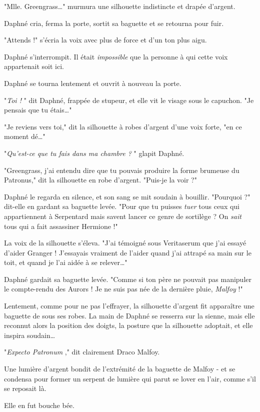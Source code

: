 "Mlle. Greengrass…" murmura une silhouette indistincte et drapée d'argent.

Daphné cria, ferma la porte, sortit sa baguette et se retourna pour fuir.

"Attends !" s'écria la voix avec plus de force et d'un ton plus aigu.

Daphné s'interrompit. Il était \emph{impossible}  que la personne à qui cette voix appartenait soit ici.

Daphné se tourna lentement et ouvrit à nouveau la porte.

"\emph{Toi !} " dit Daphné, frappée de stupeur, et elle vit le visage sous le capuchon. "Je pensais que tu étais…"

"Je reviens vers toi," dit la silhouette à robes d'argent d'une voix forte, "en ce moment dé…"

"\emph{Qu'est-ce que tu fais dans ma chambre ?} " glapit Daphné.

"Greengrass, j'ai entendu dire que tu pouvais produire la forme brumeuse du Patronus," dit la silhouette en robe d'argent. "Puis-je la voir ?"

Daphné le regarda en silence, et son sang se mit soudain à bouillir. "Pourquoi ?" dit-elle en gardant sa baguette levée. "Pour que tu puisses \emph{tuer}  tous ceux qui appartiennent à Serpentard mais savent lancer ce genre de sortilège ? On \emph{sait}  tous qui a fait assassiner Hermione !"

La voix de la silhouette s'éleva. "J'ai témoigné sous Veritaserum que j'ai essayé d'aider Granger ! J'essayais vraiment de l'aider quand j'ai attrapé sa main sur le toit, et quand je l'ai aidée à se relever…"

Daphné gardait sa baguette levée. "Comme si ton père ne pouvait pas manipuler le compte-rendu des Aurors ! Je ne suis pas née de la dernière pluie, \emph{Malfoy}  !"

Lentement, comme pour ne pas l'effrayer, la silhouette d'argent fit apparaître une baguette de sous ses robes. La main de Daphné se resserra sur la sienne, mais elle reconnut alors la position des doigts, la posture que la silhouette adoptait, et elle inspira soudain…

"\emph{Expecto Patronum} ," dit clairement Draco Malfoy.

Une lumière d'argent bondit de l'extrémité de la baguette de Malfoy - et se condensa pour former un serpent de lumière qui parut se lover en l'air, comme s'il se reposait là.

Elle en fut bouche bée.

